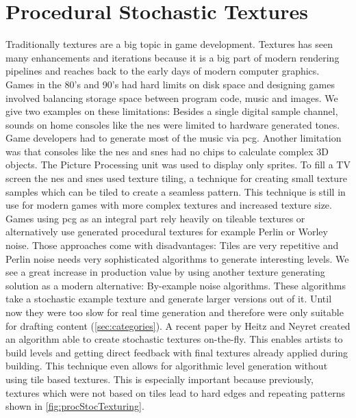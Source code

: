 \documentclass[10pt,a4paper]{article}
\begin{document}
\section{Procedural Stochastic Textures}\label{sec:pcTexture}
\begin{multicols}{2}
Traditionally textures are a big topic in game development. Textures has seen many enhancements and iterations because it is a big part of modern rendering pipelines and reaches back to the early days of modern computer graphics. Games in the 80’s and 90’s had hard limits on disk space\cite{Ferrari2016} and designing games involved balancing storage space between program code, music and images. We give two examples on these limitations: Besides a single digital sample channel, sounds on home consoles like the \gls{nes} were limited to hardware generated tones\cite{wiki:NintendoEntertainmentSystem}. Game developers had to generate most of the music via \gls{pcg}. Another limitation was that consoles like the \gls{nes} and \gls{snes} had no chips to calculate complex 3D objects. The Picture Processing unit was used to display only sprites. To fill a TV screen the \gls{nes} and \gls{snes} used texture tiling, a technique for creating small texture samples which can be tiled to create a seamless pattern. This technique is still in use for modern games with more complex textures and increased texture size. Games using \gls{pcg} as an integral part rely heavily on tileable textures or alternatively use generated procedural textures for example Perlin\cite{perlin1985image} or Worley\cite{worley1996cellular} noise. Those approaches come with disadvantages: Tiles are very repetitive and Perlin noise needs very sophisticated algorithms to generate interesting levels. We see a great increase in production value by using another texture generating solution as a modern alternative: By-example noise algorithms. These algorithms take a stochastic example texture and generate larger versions out of it. Until now they were too slow for real time generation and therefore were only suitable for drafting content (\autoref{sec:categories}). A recent paper by Heitz and Neyret created an algorithm able to create stochastic textures on-the-fly\cite{Heitz2018}. This enables artists to build levels and getting direct feedback with final textures already applied during building. This technique even allows for algorithmic level generation without using tile based textures. This is especially important because previously, textures which were not based on tiles lead to hard edges and repeating patterns shown in \autoref{fig:procStocTexturing}.
\end{multicols}
\end{document}
